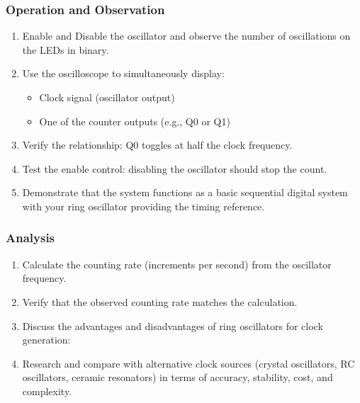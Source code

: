 \documentclass[10pt]{article}
\begin{document}
\subsubsection{Operation and Observation}

\begin{enumerate}
    
    \item Enable and Disable the oscillator and observe the number of oscillations on the LEDs in binary. 
    
    \item Use the oscilloscope to simultaneously display: 
    \begin{itemize}
        \item Clock signal (oscillator output)
        \item One of the counter outputs (e.g., Q0 or Q1)
    \end{itemize}
    
    \item Verify the relationship:  Q0 toggles at half the clock frequency.
    
    \item Test the enable control:  disabling the oscillator should stop the count.
    
    \item Demonstrate that the system functions as a basic sequential digital system with your ring oscillator providing the timing reference.
\end{enumerate}

\subsubsection{Analysis}

\begin{enumerate}
    \item Calculate the counting rate (increments per second) from the oscillator frequency.
    
    \item Verify that the observed counting rate matches the calculation. 
    
    \item Discuss the advantages and disadvantages of ring oscillators for clock generation: 
    
    \item Research and compare with alternative clock sources (crystal oscillators, RC oscillators, ceramic resonators) in terms of accuracy, stability, cost, and complexity.
\end{enumerate}
\end{document}
